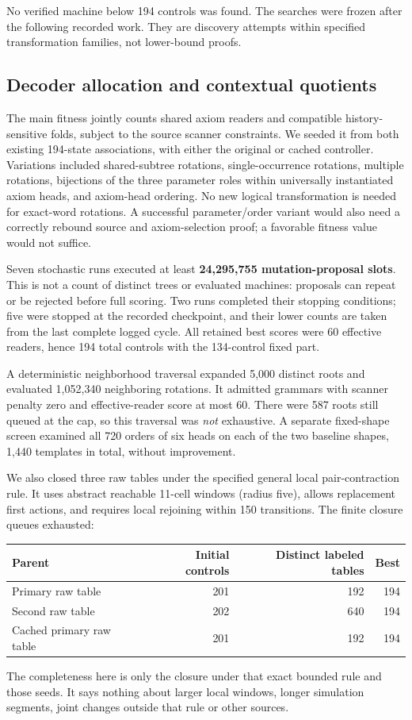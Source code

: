 No verified machine below 194 controls was found. The searches were frozen
after the following recorded work. They are discovery attempts within
specified transformation families, not lower-bound proofs.

\subsection{Decoder allocation and contextual quotients}

The main fitness jointly counts shared axiom readers and compatible
history-sensitive folds, subject to the source scanner constraints. We
seeded it from both existing 194-state associations, with either the
original or cached controller. Variations included shared-subtree
rotations, single-occurrence rotations, multiple rotations, bijections
of the three parameter roles within universally instantiated axiom heads,
and axiom-head ordering. No new logical transformation is needed for
exact-word rotations. A successful parameter/order variant would also
need a correctly rebound source and axiom-selection proof; a favorable
fitness value would not suffice.

Seven stochastic runs executed at least \textbf{24,295,755 mutation-proposal
slots}. This is not a count of distinct trees or evaluated machines:
proposals can repeat or be rejected before full scoring. Two runs completed
their stopping conditions; five were stopped at the recorded checkpoint,
and their lower counts are taken from the last complete logged cycle.
All retained best scores were 60 effective readers, hence 194 total
controls with the 134-control fixed part.

A deterministic neighborhood traversal expanded 5,000 distinct roots
and evaluated 1,052,340 neighboring rotations. It admitted grammars
with scanner penalty zero and effective-reader score at most 60.
There were 587 roots still queued at the cap, so this traversal was
\emph{not} exhaustive. A separate fixed-shape screen examined all 720
orders of six heads on each of the two baseline shapes, 1,440 templates
in total, without improvement.

We also closed three raw tables under the specified general local
pair-contraction rule. It uses abstract reachable 11-cell windows
(radius five), allows replacement first actions, and requires local
rejoining within 150 transitions. The finite closure queues exhausted:
\begin{center}
\begin{tabular}{@{}lrrr@{}}
\toprule Parent & Initial controls & Distinct labeled tables & Best\\
\midrule
Primary raw table &201&192&194\\
Second raw table &202&640&194\\
Cached primary raw table &201&192&194\\
\bottomrule
\end{tabular}
\end{center}
The completeness here is only the closure under that exact bounded rule
and those seeds. It says nothing about larger local windows, longer
simulation segments, joint changes outside that rule or other sources.

